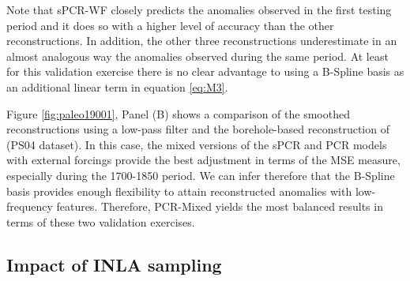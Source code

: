 \documentclass[12pt]{amsart}
\theoremstyle{plain}
\theoremstyle{definition}
\theoremstyle{remark}
\begin{document}
Note that sPCR-WF closely predicts the anomalies observed in the first testing
period and it does so with a higher level of accuracy than the other
reconstructions. In addition, the other three reconstructions underestimate in
an almost analogous way the anomalies observed during the same period. At least
for this validation exercise there is no clear advantage to using a B-Spline
basis as an additional linear term in equation \eqref{eq:M3}.

Figure \ref{fig:paleo19001}, Panel (B) shows a comparison of the smoothed reconstructions
using a low-pass filter and the borehole-based reconstruction of
\cite{Pollack2004} (PS04 dataset). In this case, the mixed versions of the sPCR
and PCR models with external forcings provide the best adjustment in terms of
the MSE measure, especially during the 1700-1850 period. We can infer therefore
that the B-Spline basis provides enough flexibility to attain reconstructed
anomalies with low-frequency features. Therefore, PCR-Mixed yields the most balanced
results in terms of these two validation exercises.


\subsection{Impact of INLA sampling}
\end{document}
